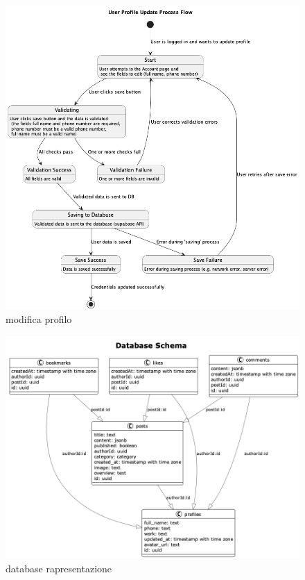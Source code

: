 \documentclass{article}
\begin{document}
\begin{figure}[h]
    \lefting
    \includegraphics[width=1.3\textwidth]{modifica_profilo_flow}
    \caption{modifica profilo}
    \label{fig:figure2}
\end{figure}

\begin{figure}[h]
    \lefting
    \includegraphics[width=1.3\textwidth]{database}
    \caption{database rapresentazione}
    \label{fig:figure}
\end{figure}
\end{document}
